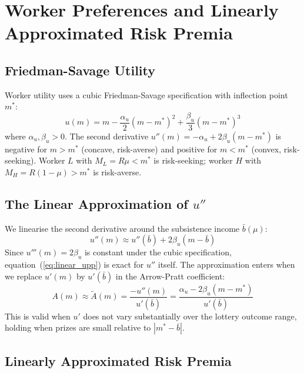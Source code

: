 \documentclass[12pt,a4paper]{article}
\begin{document}
\section{Worker Preferences and Linearly Approximated Risk Premia}

\subsection{Friedman-Savage Utility}

Worker utility uses a cubic Friedman-Savage specification with
inflection point $m^*$:
\begin{equation}
  u(m) = m - \frac{\alpha_u}{2}(m-m^*)^2 + \frac{\beta_u}{3}(m-m^*)^3
  \label{eq:cubic_u}
\end{equation}
where $\alpha_u, \beta_u > 0$. The second derivative
$u''(m) = -\alpha_u + 2\beta_u(m-m^*)$ is negative for $m > m^*$
(concave, risk-averse) and positive for $m < m^*$ (convex,
risk-seeking). Worker $L$ with $M_L = R\mu < m^*$ is risk-seeking;
worker $H$ with $M_H = R(1-\mu) > m^*$ is risk-averse.

\subsection{The Linear Approximation of $u''$}

We linearise the second derivative around the subsistence income
$\bar{b}(\mu)$:
\begin{equation}
  u''(m) \approx u''(\bar{b}) + 2\beta_u(m - \bar{b})
  \label{eq:linear_upp}
\end{equation}
Since $u'''(m) = 2\beta_u$ is constant under the cubic specification,
equation~(\ref{eq:linear_upp}) is exact for $u''$ itself. The
approximation enters when we replace $u'(m)$ by $u'(\bar{b})$ in
the Arrow-Pratt coefficient:
\begin{equation}
  A(m) \approx \tilde{A}(m)
  = \frac{-u''(m)}{u'(\bar{b})}
  = \frac{\alpha_u - 2\beta_u(m-m^*)}{u'(\bar{b})}
  \label{eq:AP_linear}
\end{equation}
This is valid when $u'$ does not vary substantially over the lottery
outcome range, holding when prizes are small relative to $|m^* - \bar{b}|$.

\subsection{Linearly Approximated Risk Premia}
\end{document}
